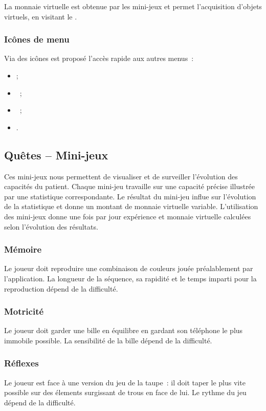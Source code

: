 \documentclass[a4paper,12pt,francais]{article}
\begin{document}
La monnaie virtuelle est obtenue par les mini-jeux et permet l’acquisition d’objets virtuels, en visitant le .

\subsubsection{Icônes de menu}

Via des icônes est proposé l’accès rapide aux autres menus~:

\begin{itemize}
    \item {};
    \item {}~;
    \item {}~;
    \item {}.
\end{itemize}

\subsection{Quêtes – Mini-jeux}\label{subsec:quetes}

Ces mini-jeux nous permettent de visualiser et de surveiller l'évolution des capacités du patient. Chaque mini-jeu travaille sur une capacité précise illustrée par une statistique correspondante. Le résultat du mini-jeu influe sur l'évolution de la statistique et donne un montant de monnaie virtuelle variable.
L'utilisation des mini-jeux donne une fois par jour expérience et monnaie virtuelle calculées selon l'évolution des résultats.

\subsubsection{Mémoire}
Le joueur doit reproduire une combinaison de couleurs jouée préalablement par l'application. La longueur de la séquence, sa rapidité et le temps imparti pour la reproduction dépend de la difficulté.

\subsubsection{Motricité}
Le joueur doit garder une bille en équilibre en gardant son téléphone le plus immobile possible. La sensibilité de la bille dépend de la difficulté.

\subsubsection{Réflexes}
Le joueur est face à une version du jeu de la taupe~: il doit taper le plus vite possible sur des élements surgissant de trous en face de lui. Le rythme du jeu dépend de la difficulté.
\end{document}
